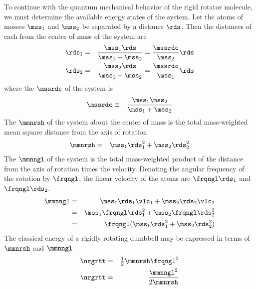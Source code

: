 \documentclass[12pt]{article}
\begin{document}
To continue with the quantum mechanical behavior of the rigid rotator
molecule, we must determine the available energy states of the system.
Let the atoms of masses $\mss_{1}$ and $\mss_{2}$ be separated by a
distance $\rds$.
Then the distances of each from the center of mass of the system are
\begin{eqnarray}
\rds_{1} & = & \frac{\mss_{1} \rds}{\mss_{1} + \mss_{2}} =
\frac{\mssrdc}{\mss_{2}} \rds \\
\rds_{2} & = & \frac{\mss_{2} \rds}{\mss_{1} + \mss_{2}} = 
\frac{\mssrdc}{\mss_{1}} \rds
\label{eqn:rgd_rtt_dst_dfn}
\end{eqnarray}
where the  $\mssrdc$ of the system is 
\begin{eqnarray}
\mssrdc & \equiv & \frac{\mss_{1} \mss_{2}}{\mss_{1} + \mss_{2}}
\label{eqn:mss_rdc_dfn}
\end{eqnarray}
The  $\mmnrsh$ of the system about the
center of mass is the total mass-weighted mean square distance from
the axis of rotation
\begin{eqnarray}
\mmnrsh & = & \mss_{1} \rds_{1}^{2} + \mss_{2} \rds_{2}^{2}
\label{eqn:mmn_rsh_dfn}
\end{eqnarray}
The  $\mmnngl$ of the system is the
total mass-weighted product of the distance from the axis of rotation
times the velocity.
Denoting the angular frequency of the rotation by $\frqngl$, 
the linear velocity of the atoms are $\frqngl \rds_{1}$ and
$\frqngl \rds_{2}$.
\begin{eqnarray}
\mmnngl & = & \mss_{1} \rds_{1} \vlc_{1} + \mss_{2} \rds_{2} \vlc_{2} \nonumber \\
& = & \mss_{1} \frqngl \rds_{1}^{2} + \mss_{2} \frqngl \rds_{2}^{2} \nonumber \\
& = & \frqngl (\mss_{1} \rds_{1}^{2} + \mss_{2} \rds_{2}^{2}) \nonumber
\label{eqn:mmn_ngl_dfn}
\end{eqnarray}
The classical energy of a rigidly rotating dumbbell may be expressed
in terms of $\mmnrsh$ and $\mmnngl$
\begin{eqnarray}
\nrgrtt & = & {\textstyle\frac{1}{2}} \mmnrsh \frqngl^{2} \nonumber \\
\label{eqn:rgd_rtt_nrg}
\nrgrtt & = & \frac{\mmnngl^{2}}{2 \mmnrsh}
\end{eqnarray}
\end{document}
